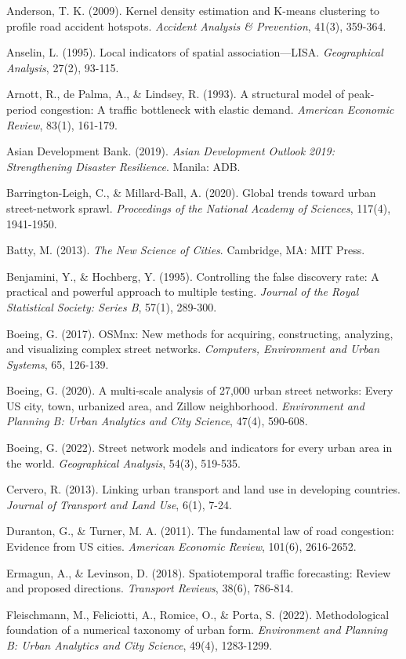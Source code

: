 \documentclass[12pt,a4paper]{article}
\begin{document}
Anderson, T. K. (2009). Kernel density estimation and K-means clustering to profile road accident hotspots. \emph{Accident Analysis \& Prevention}, 41(3), 359-364.

Anselin, L. (1995). Local indicators of spatial association---LISA. \emph{Geographical Analysis}, 27(2), 93-115.

Arnott, R., de Palma, A., \& Lindsey, R. (1993). A structural model of peak-period congestion: A traffic bottleneck with elastic demand. \emph{American Economic Review}, 83(1), 161-179.

Asian Development Bank. (2019). \emph{Asian Development Outlook 2019: Strengthening Disaster Resilience}. Manila: ADB.

Barrington-Leigh, C., \& Millard-Ball, A. (2020). Global trends toward urban street-network sprawl. \emph{Proceedings of the National Academy of Sciences}, 117(4), 1941-1950.

Batty, M. (2013). \emph{The New Science of Cities}. Cambridge, MA: MIT Press.

Benjamini, Y., \& Hochberg, Y. (1995). Controlling the false discovery rate: A practical and powerful approach to multiple testing. \emph{Journal of the Royal Statistical Society: Series B}, 57(1), 289-300.

Boeing, G. (2017). OSMnx: New methods for acquiring, constructing, analyzing, and visualizing complex street networks. \emph{Computers, Environment and Urban Systems}, 65, 126-139.

Boeing, G. (2020). A multi-scale analysis of 27,000 urban street networks: Every US city, town, urbanized area, and Zillow neighborhood. \emph{Environment and Planning B: Urban Analytics and City Science}, 47(4), 590-608.

Boeing, G. (2022). Street network models and indicators for every urban area in the world. \emph{Geographical Analysis}, 54(3), 519-535.

Cervero, R. (2013). Linking urban transport and land use in developing countries. \emph{Journal of Transport and Land Use}, 6(1), 7-24.

Duranton, G., \& Turner, M. A. (2011). The fundamental law of road congestion: Evidence from US cities. \emph{American Economic Review}, 101(6), 2616-2652.

Ermagun, A., \& Levinson, D. (2018). Spatiotemporal traffic forecasting: Review and proposed directions. \emph{Transport Reviews}, 38(6), 786-814.

Fleischmann, M., Feliciotti, A., Romice, O., \& Porta, S. (2022). Methodological foundation of a numerical taxonomy of urban form. \emph{Environment and Planning B: Urban Analytics and City Science}, 49(4), 1283-1299.
\end{document}

